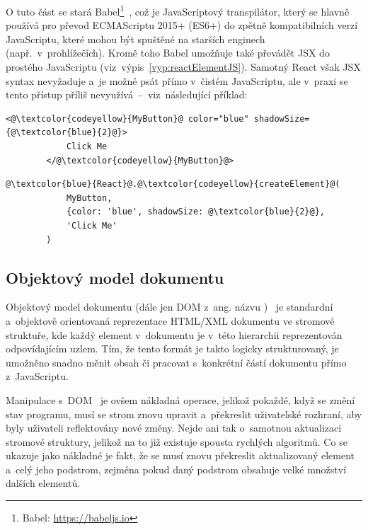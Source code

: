 O tuto část se stará Babel\footnote{Babel: \url{https://babeljs.io}}~\cite{book:LearningReact}, což je JavaScriptový transpilátor, který se hlavně používá pro převod ECMAScriptu 2015+ (ES6+) do zpětně kompatibilních verzí JavaScriptu, které mohou být spuštěné na starších enginech (např.~v~prohlížečích). Kromě toho Babel umožňuje také převádět JSX do prostého JavaScriptu (viz~výpis~\ref{vyp:reactElementJS}). Samotný React však JSX syntax nevyžaduje a~je možné psát přímo v~čistém JavaScriptu, ale v~praxi se tento přístup příliš nevyužívá~--~viz~následující příklad:

\begin{center}
    \begin{lstlisting}[escapechar=@, label={vyp:reactElementJSX}, caption={Definice elementu v~syntaxi JSX.}]
        <@\textcolor{codeyellow}{MyButton}@ color="blue" shadowSize={@\textcolor{blue}{2}@}>
            Click Me
        </@\textcolor{codeyellow}{MyButton}@>
    \end{lstlisting}
\end{center}

\begin{center}
    \begin{lstlisting}[escapechar=@, label={vyp:reactElementJS}, caption={Ekvivalentní zápis elementu z~výpisu~\ref{vyp:reactElementJSX} v~JavaScriptu.}]
        @\textcolor{blue}{React}@.@\textcolor{codeyellow}{createElement}@(
            MyButton,
            {color: 'blue', shadowSize: @\textcolor{blue}{2}@},
            'Click Me'
        )
    \end{lstlisting}
\end{center}

\subsection{Objektový model dokumentu}
Objektový model dokumentu (dále jen DOM z~ang. názvu \emph{})~\cite{thesis:WebApp} je standardní a~objektově orientovaná reprezentace HTML/XML dokumentu ve stromové struktuře, kde každý element v~dokumentu je v~této hierarchii reprezentován odpovídajícím uzlem. Tím, že tento formát je takto logicky strukturovaný, je umožněno snadno měnit obsah či pracovat s~konkrétní částí dokumentu přímo z~JavaScriptu.

Manipulace s~DOM~\cite{website:ReactVirtualDOM} je ovšem nákladná operace, jelikož pokaždé, když se změní stav programu, musí se strom znovu upravit a~překreslit uživatelské rozhraní, aby byly uživateli reflektovány nové změny. Nejde ani tak o~samotnou aktualizaci stromové struktury, jelikož na to již existuje spousta rychlých algoritmů. Co se ukazuje jako nákladné je fakt, že se musí znovu překreslit aktualizovaný element a~celý jeho podstrom, zejména pokud daný podstrom obsahuje velké množství dalších elementů.

